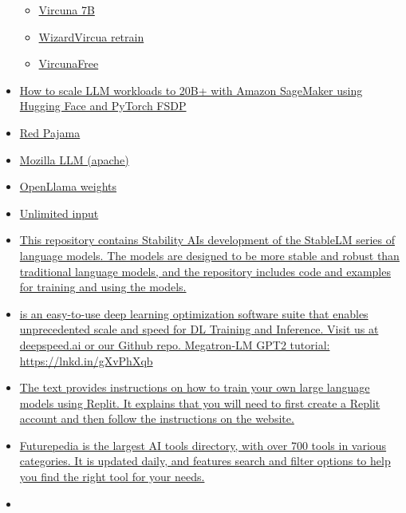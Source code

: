 \begin{itemize}
  \begin{itemize}
   
  \item
    \href{https://github.com/lm-sys/FastChat\#fine-tuning-vicuna-7b-with-local-gpus}{Vircuna
    7B}
  \item
    \href{https://www.reddit.com/r/LocalLLaMA/comments/1376oho/introducing_wizardvicunalm_combining_wizardlm_and/}{WizardVircua
    retrain}
  \item
    \href{https://huggingface.co/reeducator/vicuna-13b-free}{VircunaFree}
  \end{itemize}
\item
  \href{https://www.philschmid.de/sagemaker-fsdp-gpt}{How to scale LLM
  workloads to 20B+ with Amazon SageMaker using Hugging Face and PyTorch
  FSDP}
\item
  \href{https://www.together.xyz/blog/redpajama-models-v1}{Red Pajama}
\item
  \href{https://www.mosaicml.com/blog/mpt-7b}{Mozilla LLM (apache)}
\item
  \href{https://huggingface.co/openlm-research}{OpenLlama weights}
\item
  \href{https://github.com/abertsch72/unlimiformer}{Unlimited input}
\item
  \href{https://github.com/stability-AI/stableLM/}{This repository
  contains Stability AI\textquotesingle s development of the StableLM
  series of language models. The models are designed to be more stable
  and robust than traditional language models, and the repository
  includes code and examples for training and using the models.}
\item
  \href{https://github.com/microsoft/DeepSpeed}{          is an
  easy-to-use deep learning optimization software suite that enables
  unprecedented scale and speed for DL Training and Inference. Visit us
  at deepspeed.ai or our Github repo.  Megatron-LM GPT2 tutorial:
  https://lnkd.in/gXvPhXqb}
\item
  \href{https://blog.replit.com/llm-training}{The text provides
  instructions on how to train your own large language models using
  Replit. It explains that you will need to first create a Replit
  account and then follow the instructions on the website.}
\item
  \href{http://Futurepedia.io}{Futurepedia is the largest AI tools
  directory, with over 700 tools in various categories. It is updated
  daily, and features search and filter options to help you find the
  right tool for your needs.}
\item

\end{itemize}
